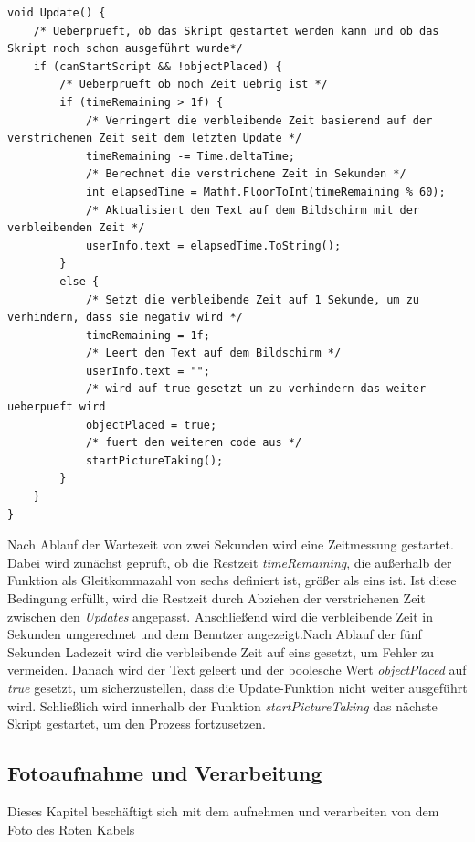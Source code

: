 \begin{lstlisting}[style=csharp, caption={Update des \textit{CableSearch} Skripts}, label=code:Timer]
void Update() {
    /* Ueberprueft, ob das Skript gestartet werden kann und ob das Skript noch schon ausgeführt wurde*/
    if (canStartScript && !objectPlaced) {
        /* Ueberprueft ob noch Zeit uebrig ist */
        if (timeRemaining > 1f) {
            /* Verringert die verbleibende Zeit basierend auf der verstrichenen Zeit seit dem letzten Update */
            timeRemaining -= Time.deltaTime;
            /* Berechnet die verstrichene Zeit in Sekunden */
            int elapsedTime = Mathf.FloorToInt(timeRemaining % 60);
            /* Aktualisiert den Text auf dem Bildschirm mit der verbleibenden Zeit */
            userInfo.text = elapsedTime.ToString();
        }
        else {
            /* Setzt die verbleibende Zeit auf 1 Sekunde, um zu verhindern, dass sie negativ wird */
            timeRemaining = 1f;
            /* Leert den Text auf dem Bildschirm */
            userInfo.text = "";
            /* wird auf true gesetzt um zu verhindern das weiter ueberpueft wird
            objectPlaced = true;
            /* fuert den weiteren code aus */
            startPictureTaking();
        }
    }
}
\end{lstlisting}
Nach Ablauf der Wartezeit von zwei Sekunden wird eine Zeitmessung gestartet. Dabei wird zunächst geprüft, ob die Restzeit \textit{timeRemaining}, die außerhalb der Funktion als Gleitkommazahl von sechs definiert ist, größer als eins ist. Ist diese Bedingung erfüllt, wird die Restzeit durch Abziehen der verstrichenen Zeit zwischen den \textit{Updates} angepasst. Anschließend wird die verbleibende Zeit in Sekunden umgerechnet und dem Benutzer angezeigt.Nach Ablauf der fünf Sekunden Ladezeit wird die verbleibende Zeit auf eins gesetzt, um Fehler zu vermeiden. Danach wird der Text geleert und der boolesche Wert \textit{objectPlaced} auf \textit{true} gesetzt, um sicherzustellen, dass die Update-Funktion nicht weiter ausgeführt wird. Schließlich wird innerhalb der Funktion \textit{startPictureTaking} das nächste Skript gestartet, um den Prozess fortzusetzen.

\subsection{Fotoaufnahme und Verarbeitung}
Dieses Kapitel beschäftigt sich mit dem aufnehmen und verarbeiten von dem Foto des Roten Kabels
